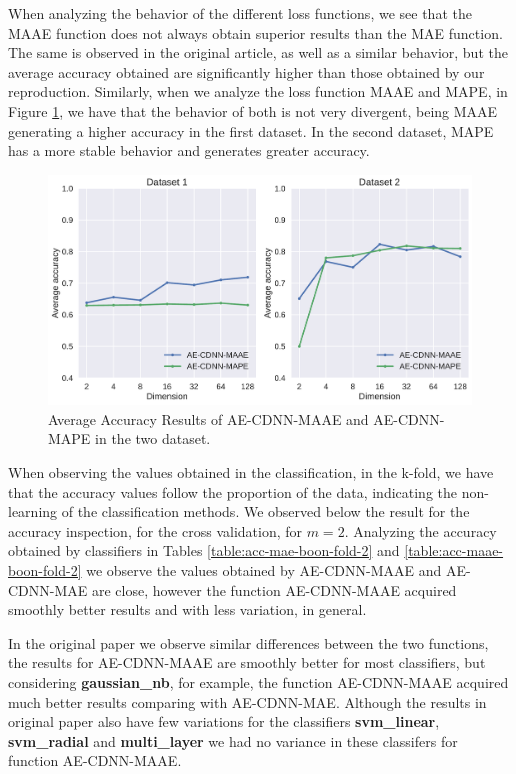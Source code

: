 When analyzing the behavior of the different loss functions, we see that the MAAE function does not always obtain superior results than the MAE function. The same is observed in the original article, as well as a similar behavior, but the average accuracy obtained are significantly higher than those obtained by our reproduction. Similarly, when we analyze the loss function MAAE and MAPE, in Figure \ref{fig:average-maae-mape}, we have that the behavior of both is not very divergent, being MAAE generating a higher accuracy in the first dataset. In the second dataset, MAPE has a more stable behavior and generates greater accuracy. 


\begin{figure}[!ht]
\centering
\includegraphics[width=0.8\linewidth]{figure/average-MAAE-MAPE.pdf}
  \caption{Average Accuracy Results of AE-CDNN-MAAE and AE-CDNN-MAPE in the two dataset.}
\label{fig:average-maae-mape}
\end{figure}

When observing the values obtained in the classification, in the k-fold, we have that the accuracy values follow the proportion of the data, indicating the non-learning of the classification methods. We observed below the result for the accuracy inspection, for the cross validation, for $m = 2$. Analyzing the accuracy obtained by classifiers in Tables \ref{table:acc-mae-boon-fold-2} and \ref{table:acc-maae-boon-fold-2} we observe the values obtained by AE-CDNN-MAAE and AE-CDNN-MAE are close, however the function AE-CDNN-MAAE acquired smoothly better results and with less variation, in general. 





In the original paper we observe similar differences between the two functions, the results for AE-CDNN-MAAE are smoothly better for most classifiers, but considering \textbf{gaussian\_nb}, for example, the function AE-CDNN-MAAE acquired much better results comparing with AE-CDNN-MAE. Although the results in original paper also have few variations for the classifiers \textbf{svm\_linear}, \textbf{svm\_radial} and \textbf{multi\_layer} we had no variance in these classifers for function AE-CDNN-MAAE.


